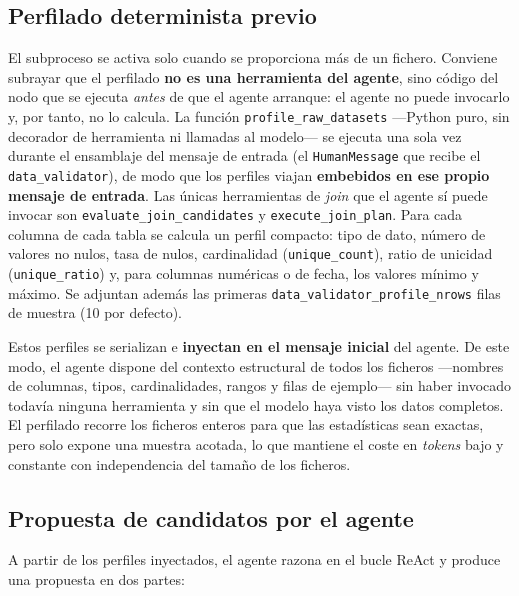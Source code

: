 \subsection{Perfilado determinista previo}
\label{sec:join-perfilado}

El subproceso se activa solo cuando se proporciona más de un fichero. Conviene subrayar
que el perfilado \textbf{no es una herramienta del agente}, sino código del nodo que se
ejecuta \emph{antes} de que el agente arranque: el agente no puede invocarlo y, por tanto,
no lo calcula. La función \texttt{profile\_raw\_datasets} —Python puro, sin decorador de
herramienta ni llamadas al modelo— se ejecuta una sola vez durante el ensamblaje del
mensaje de entrada (el \texttt{HumanMessage} que recibe el \texttt{data\_validator}), de
modo que los perfiles viajan \textbf{embebidos en ese propio mensaje de entrada}. Las
únicas herramientas de \textit{join} que el agente sí puede invocar son
\texttt{evaluate\_join\_candidates} y \texttt{execute\_join\_plan}. Para cada columna de cada tabla se calcula un perfil
compacto: tipo de dato, número de valores no nulos, tasa de nulos, cardinalidad
(\texttt{unique\_count}), ratio de unicidad (\texttt{unique\_ratio}) y, para columnas
numéricas o de fecha, los valores mínimo y máximo. Se adjuntan además las primeras
\texttt{data\_validator\_profile\_nrows} filas de muestra (10 por defecto).

Estos perfiles se serializan e \textbf{inyectan en el mensaje inicial} del agente. De
este modo, el agente dispone del contexto estructural de todos los ficheros —nombres de
columnas, tipos, cardinalidades, rangos y filas de ejemplo— sin haber invocado todavía
ninguna herramienta y sin que el modelo haya visto los datos completos. El perfilado
recorre los ficheros enteros para que las estadísticas sean exactas, pero solo expone
una muestra acotada, lo que mantiene el coste en \textit{tokens} bajo y constante con
independencia del tamaño de los ficheros.

\subsection{Propuesta de candidatos por el agente}
\label{sec:join-candidatos}

A partir de los perfiles inyectados, el agente razona en el bucle ReAct y produce una
propuesta en dos partes:

